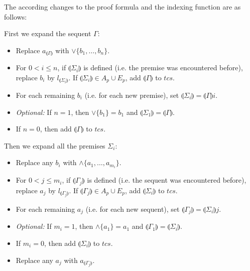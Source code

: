 \documentclass{llncs}
\newcommand{\ind}[1]{\llparenthesis #1 \rrparenthesis}
\begin{document}
The according changes to the proof formula and the indexing function are as follows:

\noindent First we expand the sequent $\Gamma$:
\begin{itemize}
\item Replace $a_{\ind{\Gamma}}$ with $\vee\{b_1,\ldots,b_n\}$.
\item For $0<i\leq n$, if $\ind{\Sigma_i}$ is defined (i.e. the premise was encountered before),
replace $b_i$ by $l_{\ind{\Sigma_i}}$. If $\ind{\Sigma_i}\in A_p\cup E_p$, add $\ind{\Gamma}$ to $tcs$.
\item For each remaining $b_i$ (i.e. for each new premise), set $\ind{\Sigma_i}=\ind{\Gamma}i$.
\item \emph{Optional:} If $n=1$, then $\vee\{b_1\}=b_1$ and $\ind{\Sigma_1}=\ind{\Gamma}$.
\item If $n=0$, then add $\ind{\Gamma}$ to $tcs$.
\end{itemize}

\noindent Then we expand all the premises $\Sigma_i$:
\begin{itemize}
\item Replace any $b_i$ with $\wedge\{a_1,\ldots,a_{m_i}\}$.
\item For $0<j\leq m_i$, if $\ind{\Gamma_j}$ is defined (i.e. the sequent was encountered before), 
replace $a_j$ by $l_{\ind{\Gamma_j}}$. If $\ind{\Gamma_j}\in A_p\cup E_p$, add $\ind{\Sigma_i}$ to $tcs$.
\item For each remaining $a_j$ (i.e. for each new sequent), set $\ind{\Gamma_j}=\ind{\Sigma_i}j$.
\item \emph{Optional:} If $m_i=1$, then $\wedge\{a_1\}=a_1$ and $\ind{\Gamma_1}=\ind{\Sigma_i}$.
\item If $m_i=0$, then add $\ind{\Sigma_i}$ to $tcs$.
\item Replace any $a_j$ with $a_{\ind{\Gamma_j}}$.
\end{itemize}
\end{document}
